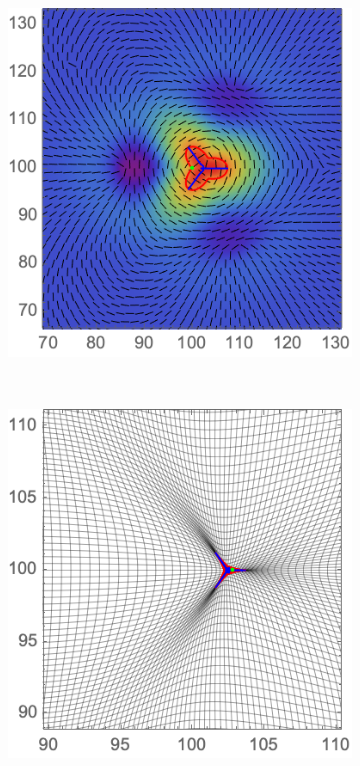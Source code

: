 \documentclass[a4paper, 11pt]{article}
\begin{document}
\begin{figure}
\begin{subfigure}[b]{0.32\textwidth}
\end{subfigure}~
\begin{subfigure}[b]{0.32\textwidth}
\includegraphics[width=\textwidth]{Hyperbolic_mean_L}
\end{subfigure}~
\begin{subfigure}[b]{0.32\textwidth}
\includegraphics[width=\textwidth]{Hyperbolic_mean_Z}

\end{subfigure}
\end{figure}
\end{document}
